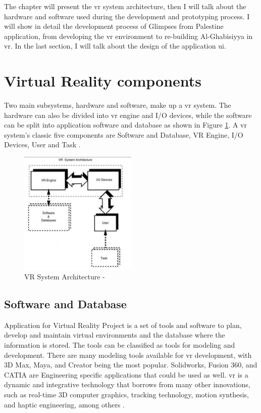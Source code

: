 The chapter will present the \acrlong{vr} system architecture, then I will talk about the hardware and software used during the development and prototyping process. I will show in detail the development process of Glimpses from Palestine application, from developing the \acrshort{vr} environment to re-building Al-Ghabisiyya in \acrlong{vr}. In the last section, I will talk about the design of the application \acrlong{ui}.

\section{Virtual Reality components}



Two main subsystems, hardware and software, make up a \acrshort{vr} system. The hardware can also be divided into \acrshort{vr} engine and I/O devices, while the software can be split into application software and database as shown in Figure \ref{fig:sys}. A \acrshort{vr} system's classic five components are Software and Database, VR Engine, I/O Devices, User and Task \citep{burdea2017virtual,Bamodu2013VirtualComponents}.

\begin{figure}[ht]
    \centering
    \includegraphics[width=0.50\textwidth]{images/VR.png}
    \caption{VR System Architecture - \citep{burdea2017virtual}}
    \label{fig:sys}
\end{figure}


\subsection{Software and Database}
Application for Virtual Reality Project is a set of tools and software to plan, develop and maintain virtual environments and the database where the information is stored. The tools can be classified as tools for modeling and development. There are many modeling tools available for \acrshort{vr} development, with 3D Max, Maya, and Creator being the most popular. Solidworks, Fusion 360, and CATIA are Engineering specific applications that could be used as well. \acrshort{vr} is a dynamic and integrative technology that borrows from many other innovations, such as real-time 3D computer graphics, tracking technology, motion synthesis, and haptic engineering, among others \citep{burdea2017virtual, Bamodu2013VirtualComponents}.


